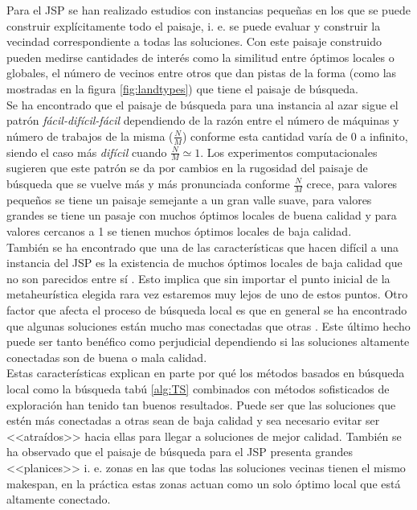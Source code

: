 Para el JSP se han realizado estudios con instancias pequeñas en los que se puede construir explícitamente todo el paisaje, i. e. se puede evaluar y construir la vecindad correspondiente a todas las soluciones. Con este paisaje construido pueden medirse cantidades de interés como la similitud entre óptimos locales o globales, el número de vecinos entre otros que dan pistas de la forma (como las mostradas en la figura \ref{fig:landtypes}) que tiene el paisaje de búsqueda.\\

Se ha encontrado que el paisaje de búsqueda para una instancia al azar sigue el patrón \textit{fácil-difícil-fácil} dependiendo de la razón entre el número de máquinas y número de trabajos de la misma\cite{Streeter2006}  ($\frac{N}{M}$) conforme esta cantidad  varía de 0 a infinito, siendo el caso más \textit{difícil} cuando $\frac{N}{M}\simeq 1$. Los experimentos computacionales sugieren que este patrón se da por cambios en la rugosidad del paisaje de búsqueda que se vuelve más y más pronunciada conforme $\frac{N}{M}$ crece, para valores pequeños se tiene un paisaje semejante a un gran valle suave, para valores grandes se tiene un pasaje con muchos óptimos locales de buena calidad y para valores cercanos a 1 se tienen muchos óptimos locales de baja calidad.\\


También se ha encontrado que una de las características que hacen difícil a una instancia del JSP es la existencia de muchos óptimos locales de baja calidad que no son parecidos entre sí \cite{mattfeld1999search}. Esto implica que sin importar el punto inicial de la metaheurística elegida rara vez estaremos muy lejos de uno de estos puntos. Otro factor que afecta el proceso de búsqueda local es que en general se ha encontrado que algunas soluciones están mucho mas conectadas que otras \cite{bierwirth2004landscape}. Este último hecho puede ser tanto benéfico como perjudicial dependiendo si las soluciones altamente conectadas son de buena o mala calidad. \\


Estas características explican en parte por qué los métodos basados en búsqueda local como la búsqueda tabú \ref{alg:TS} combinados con métodos sofisticados de exploración han tenido tan buenos resultados\cite{watson2003problem}. Puede ser que las soluciones que estén más conectadas a otras sean de baja calidad y sea necesario evitar ser <<atraídos>> hacia ellas para llegar a soluciones de mejor calidad. También se ha observado que el paisaje de búsqueda para el JSP presenta grandes <<planices>> i. e. zonas en las que todas las soluciones vecinas tienen el mismo makespan, en la práctica estas zonas actuan como un solo óptimo local que está altamente conectado.


